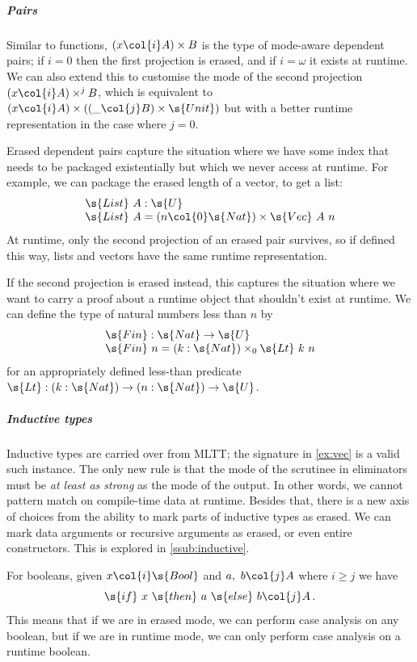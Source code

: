\subparagraph{Pairs}\label{ssub:dep-pairs} Similar to functions, $(x \col{i} A)
\times B$ is the type of mode-aware dependent pairs; if $i = 0$ then the
first projection is erased, and if $i = \omega$ it exists at runtime.  We can also extend this to customise the mode of
the second projection $(x \col{i} A) \times^{j} B$, which is equivalent to $(x
\col{i} A) \times ((\_ \col{j} B) \times \s{Unit})$ but with a better
runtime representation in the case where $j = 0$.

\begin{example}
Erased dependent pairs capture the situation where we have some index that needs
to be packaged existentially but which we never access at runtime. For example, we can
package the erased length of a vector, to get a list:
\[\begin{array}{l}
  \s{List}\ A: \s{U} \\
  \s{List}\ A = (n \col{0} \s{Nat}) \times \s{Vec}\ A\ n \end{array} \] At
runtime, only the second projection of an erased pair survives, so if defined
this way, lists and vectors have the same runtime representation.
\end{example}

\begin{example}
If the second projection is erased instead, this captures the situation where
we want to carry a proof about a runtime object that shouldn't exist at runtime.
We can define the type of natural numbers less than $n$ by
\[\begin{array}{l}
\s{Fin} : \s{Nat} \to \s{U} \\
\s{Fin}\ n = (k : \s{Nat}) \times_0 \s{Lt}\ k\ n \end{array} \] for an
appropriately defined less-than predicate $\s{Lt} : (k : \s{Nat}) \to (n :
\s{Nat}) \to \s{U}$.
\end{example}

\subparagraph{Inductive types}
Inductive types are carried over from MLTT; the signature in \cref{ex:vec} is a
valid such instance. The only new rule is that the mode of the scrutinee in
eliminators must be \emph{at least as strong} as the mode of the output. In
other words, we cannot pattern match on compile-time data at runtime. Besides
that, there is a new axis of choices from the ability to mark parts of inductive
types as erased. We can mark data arguments or recursive arguments as erased, or
even entire constructors. This is explored in \cref{ssub:inductive}.

\begin{example}
For booleans, given $x \col{i} \s{Bool}$ and $a,\ b \col{j} A$ where
$i \geq j$ we have
\[
  \s{if}\ x\ \s{then}\ a\ \s{else}\ b \col{j} A \,.
\]
This means that if we are in erased mode, we can perform
case analysis on any boolean, but if we are in runtime mode, we
can only perform case analysis on a runtime boolean.
\end{example}


